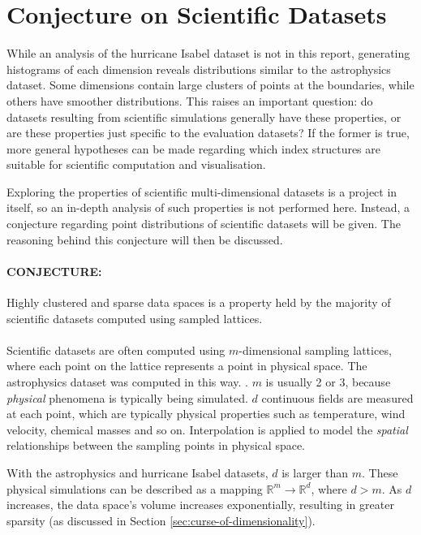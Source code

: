\section{Conjecture on Scientific Datasets}

While an analysis of the hurricane Isabel dataset is not in this report, generating histograms of each dimension reveals distributions similar to the astrophysics dataset. Some dimensions contain large clusters of points at the boundaries, while others have smoother distributions. This raises an important question: do datasets resulting from scientific simulations generally have these properties, or are these properties just specific to the evaluation datasets? If the former is true, more general hypotheses can be made regarding which index structures are suitable for scientific computation and visualisation.

Exploring the properties of scientific multi-dimensional datasets is a project in itself, so an in-depth analysis of such properties is not performed here. Instead, a conjecture regarding point distributions of scientific datasets will be given. The reasoning behind this conjecture will then be discussed.

\paragraph{\textbf{CONJECTURE:}} Highly clustered and sparse data spaces is a property held by the majority of scientific datasets computed using sampled lattices.
\paragraph{}

Scientific datasets are often computed using $m$-dimensional sampling lattices, where each point on the lattice represents a point in physical space. The astrophysics dataset was computed in this way. \cite{astrophysics-dataset}. $m$ is usually 2 or 3, because \textit{physical} phenomena is typically being simulated. $d$ continuous fields are measured at each point, which are typically physical properties such as temperature, wind velocity, chemical masses and so on. Interpolation is applied to model the \textit{spatial} relationships between the sampling points in physical space.

With the astrophysics and hurricane Isabel datasets, $d$ is larger than $m$. These physical simulations can be described as a mapping $\mathbb{R}^m \rightarrow \mathbb{R}^d$, where $d > m$. As $d$ increases, the data space's volume increases exponentially, resulting in greater sparsity (as discussed in Section \ref{sec:curse-of-dimensionality}).

